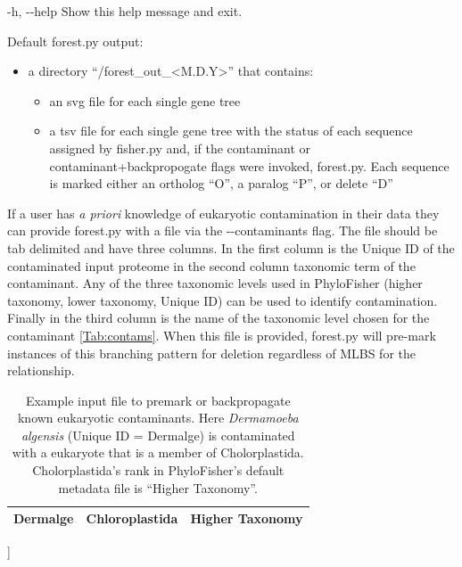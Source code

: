 \documentclass{article}
\begin{document}
\begin{enumerate}[itemsep=12pt]
\begin{description}
\begin{description}
                \item -h, -\/-help \hspace{0.2cm} Show this help message and exit.
            \end{description}
            \vspace{0.2cm}
            \item Default forest.py output:
                \begin{itemize}
                    \item a directory “/forest\_out\_<M.D.Y>” that contains:
                    \begin{itemize}
                        \item an svg file for each single gene tree
                        \item a tsv file for each single gene tree with the status of each sequence assigned by fisher.py and, if the contaminant or contaminant+backpropogate flags were invoked, forest.py. Each sequence is marked either an ortholog “O”, a paralog “P”, or delete “D”
                    \end{itemize}
                \end{itemize}
                \vspace{0.4cm}
                If a user has \textit{a priori} knowledge of eukaryotic contamination in their data they can provide forest.py with a file via the -\/-contaminants flag. The file should be tab delimited and have three columns. In the first column is the Unique ID of the contaminated input proteome in the second column taxonomic term of the contaminant. Any of the three taxonomic levels used in PhyloFisher (higher taxonomy, lower taxonomy, Unique ID) can be used to identify contamination. Finally in the third column is the name of the taxonomic level chosen for the contaminant \autoref{Tab:contams}. When this file is provided, forest.py will pre-mark instances of this branching pattern for deletion regardless of MLBS for the relationship.
                
            \vspace{0.5cm}
            \begin{table}[h]
            \centering
            \begin{tabular}{|c|c|c|}
                \hline Dermalge & Chloroplastida & Higher Taxonomy  \\ \hline
                    \end{tabular}]
                    \captionsetup{width=.80\textwidth}
                    \caption{Example input file to premark or backpropagate known eukaryotic contaminants. Here \textit{Dermamoeba algensis} (Unique ID = Dermalge) is contaminated with a eukaryote that is a member of Cholorplastida. Cholorplastida’s rank in PhyloFisher’s default metadata file is “Higher Taxonomy”.}
                    \label{Tab:contams}
            \end{table}
            

\end{description}
\end{enumerate}
\end{document}
